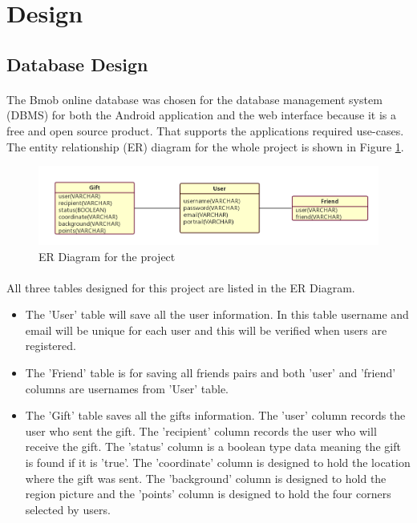 \section{Design}
\label{sec:Design}

\subsection{Database Design} 
\paragraph{}The Bmob online database was chosen for the database management system (DBMS) for both the Android application and the web interface because it is a free and open source product. That supports the applications required use-cases. The entity relationship (ER) diagram for the whole project is shown in Figure \ref{ERDiagram}.

\begin{figure}[htb]
\centering
\includegraphics[width=.9\textwidth]{section03/assets/ERDiagram.png}
\caption[Short Caption 2]{\label{ERDiagram}ER Diagram for the project}
\end{figure}

\paragraph{}
All three tables designed for this project are listed in the ER Diagram.
\begin{itemize}
\item The 'User' table will save all the user information. In this table username and email will be unique for each user and this will be verified when users are registered.
\item The 'Friend' table is for saving all friends pairs and both 'user' and 'friend' columns are usernames from 'User' table.
\item The 'Gift' table saves all the gifts information. The 'user' column records the user who sent the gift. The 'recipient' column records the user who will receive the gift. The 'status' column is a boolean type data meaning the gift is found if it is 'true'. The 'coordinate' column is designed to hold the location where the gift was sent. The 'background' column is designed to hold the region picture and the 'points' column is designed to hold the four corners selected by users.
\end{itemize}

